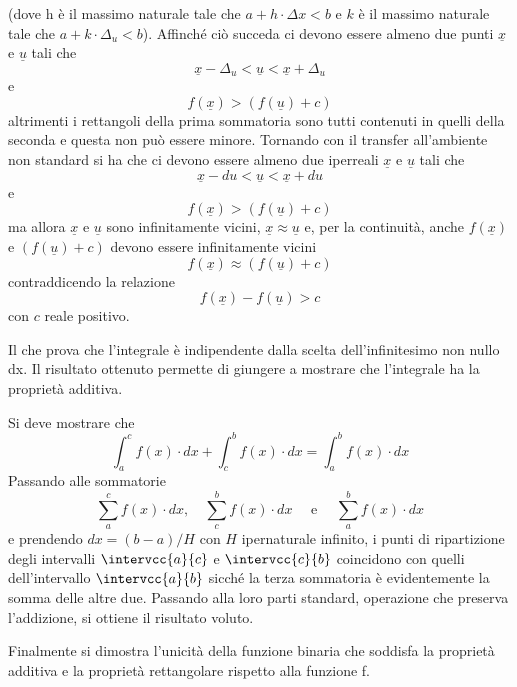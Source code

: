 (dove h è il massimo naturale tale che 
\(a+h \cdot \Delta x < b\) 
e \(k\) è il massimo naturale tale che
\(a+k \cdot \Delta_u < b\)).
Affinché ciò succeda ci devono essere almeno 
due punti 
\(\underline{x}\) e \(\underline{u}\)
tali che 
\[\underline{x} - \Delta_u < \underline{u} < \underline{x} + \Delta_u \]
e 
\[f(\underline{x}) > (f(\underline{u})+c)\] 
altrimenti i rettangoli della prima sommatoria sono tutti contenuti in quelli 
della seconda e questa non può essere minore. Tornando con il transfer 
all'ambiente non standard si ha che ci devono essere almeno due iperreali 
\(\underline{x}\) e \(\underline{u}\)
tali che 
\[\underline{x} - du < \underline{u} < \underline{x}+ du\]
e 
\[f(\underline{x}) > (f(\underline{u})+c)\] 
ma allora \(\underline{x}\) e \(\underline{u}\)
sono infinitamente vicini,  
\(\underline{x} \approx \underline{u}\)
e, per la continuità, anche 
\(f(\underline{x})\) e \((f(\underline{u})+c)\) 
devono essere infinitamente vicini 
\[f(\underline{x}) \approx (f(\underline{u})+c)\] 
contraddicendo la relazione 
\[f(\underline{x}) - f(\underline{u}) > c\]
con \(c\) reale positivo. 

Il che prova che l'integrale è indipendente dalla scelta dell'infinitesimo non 
nullo dx.
Il risultato ottenuto permette di giungere a mostrare che 
l'integrale ha la proprietà additiva.

Si deve mostrare che 
\[\int_a^c f(x) \cdot dx + \int_c^b f(x) \cdot dx = \int_a^b f(x) \cdot dx\] 
Passando alle sommatorie 
\[\sum_a^c f(x) \cdot dx,\quad \sum_c^b f(x) \cdot dx \quad\text{ e } \quad 
  \sum_a^b f(x) \cdot dx\] 
e prendendo 
\(dx = (b-a)/H\)
con \(H\) ipernaturale infinito, 
i punti di ripartizione degli intervalli \(\intervcc{a}{c}\) e 
\(\intervcc{c}{b}\) coincidono con quelli dell'intervallo \(\intervcc{a}{b}\)
sicché la terza sommatoria è evidentemente la somma delle altre due.
Passando alla loro parti standard, operazione che preserva l'addizione, si 
ottiene il risultato voluto. 

Finalmente si dimostra l'unicità della funzione binaria che soddisfa la 
proprietà additiva e la proprietà rettangolare rispetto alla funzione f.

